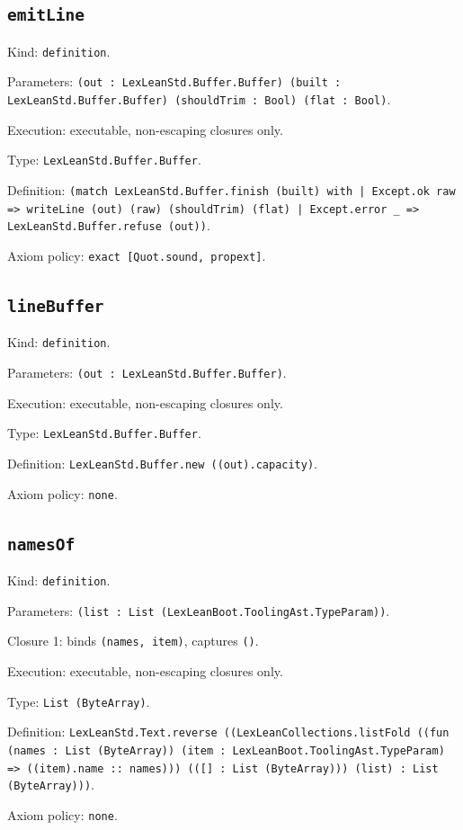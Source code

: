 \documentclass[11pt]{article}
\begin{document}
\subsection*{\texttt{emitLine}}
\noindent Kind: \texttt{definition}.\par
\noindent Parameters: \texttt{(out : LexLeanStd.Buffer.Buffer) (built : LexLeanStd.Buffer.Buffer) (shouldTrim : Bool) (flat : Bool)}.\par
\noindent Execution: executable, non-escaping closures only.\par
\noindent Type: \texttt{LexLeanStd.Buffer.Buffer}.\par
\noindent Definition: \texttt{(match LexLeanStd.Buffer.finish (built) with | Except.ok raw => writeLine (out) (raw) (shouldTrim) (flat) | Except.error \_ => LexLeanStd.Buffer.refuse (out))}.\par
\noindent Axiom policy: \texttt{exact [Quot.sound, propext]}.\par
\subsection*{\texttt{lineBuffer}}
\noindent Kind: \texttt{definition}.\par
\noindent Parameters: \texttt{(out : LexLeanStd.Buffer.Buffer)}.\par
\noindent Execution: executable, non-escaping closures only.\par
\noindent Type: \texttt{LexLeanStd.Buffer.Buffer}.\par
\noindent Definition: \texttt{LexLeanStd.Buffer.new ((out).capacity)}.\par
\noindent Axiom policy: \texttt{none}.\par
\subsection*{\texttt{namesOf}}
\noindent Kind: \texttt{definition}.\par
\noindent Parameters: \texttt{(list : List (LexLeanBoot.ToolingAst.TypeParam))}.\par
\noindent Closure 1: binds \texttt{(names, item)}, captures \texttt{()}.\par
\noindent Execution: executable, non-escaping closures only.\par
\noindent Type: \texttt{List (ByteArray)}.\par
\noindent Definition: \texttt{LexLeanStd.Text.reverse ((LexLeanCollections.listFold ((fun (names : List (ByteArray)) (item : LexLeanBoot.ToolingAst.TypeParam) => ((item).name :: names))) (([] : List (ByteArray))) (list) : List (ByteArray)))}.\par
\noindent Axiom policy: \texttt{none}.\par
\end{document}
